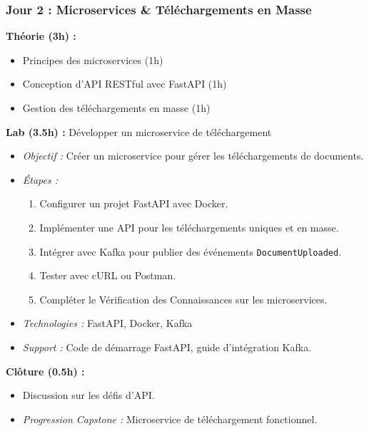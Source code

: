 \documentclass[11pt]{article}
\begin{document}
\subsubsection{Jour 2 : Microservices \& Téléchargements en Masse}
\textbf{Théorie (3h) :}
\begin{itemize}
    \item Principes des microservices (1h)
    \item Conception d'API RESTful avec FastAPI (1h)
    \item Gestion des téléchargements en masse (1h)
\end{itemize}
\textbf{Lab (3.5h) :} Développer un microservice de téléchargement
\begin{itemize}
    \item \textit{Objectif :} Créer un microservice pour gérer les téléchargements de documents.
    \item \textit{Étapes :}
        \begin{enumerate}
            \item Configurer un projet FastAPI avec Docker.
            \item Implémenter une API pour les téléchargements uniques et en masse.
            \item Intégrer avec Kafka pour publier des événements \texttt{DocumentUploaded}.
            \item Tester avec cURL ou Postman.
            \item Compléter le Vérification des Connaissances sur les microservices.
        \end{enumerate}
    \item \textit{Technologies :} FastAPI, Docker, Kafka
    \item \textit{Support :} Code de démarrage FastAPI, guide d'intégration Kafka.
\end{itemize}
\textbf{Clôture (0.5h) :}
\begin{itemize}
    \item Discussion sur les défis d'API.
    \item \textit{Progression Capstone :} Microservice de téléchargement fonctionnel.
\end{itemize}
\end{document}

